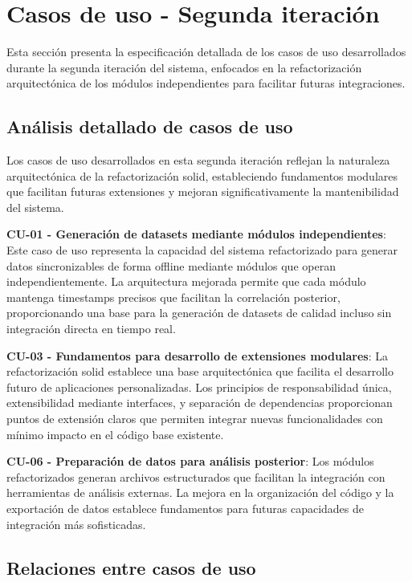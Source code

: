 \section{Casos de uso - Segunda iteración}
\label{sec:casos_uso_it2}

Esta sección presenta la especificación detallada de los casos de uso desarrollados durante la segunda iteración del sistema, enfocados en la refactorización arquitectónica de los módulos independientes para facilitar futuras integraciones.

\subsection{Análisis detallado de casos de uso}
\label{subsec:analisis_detallado_casos_uso_it2}

Los casos de uso desarrollados en esta segunda iteración reflejan la naturaleza arquitectónica de la refactorización \acrshort{solid}, estableciendo fundamentos modulares que facilitan futuras extensiones y mejoran significativamente la mantenibilidad del sistema.

\textbf{CU-01 - Generación de datasets mediante módulos independientes}: Este caso de uso representa la capacidad del sistema refactorizado para generar datos sincronizables de forma offline mediante módulos que operan independientemente. La arquitectura mejorada permite que cada módulo mantenga timestamps precisos que facilitan la correlación posterior, proporcionando una base para la generación de datasets de calidad incluso sin integración directa en tiempo real.

\textbf{CU-03 - Fundamentos para desarrollo de extensiones modulares}: La refactorización \acrshort{solid} establece una base arquitectónica que facilita el desarrollo futuro de aplicaciones personalizadas. Los principios de responsabilidad única, extensibilidad mediante interfaces, y separación de dependencias proporcionan puntos de extensión claros que permiten integrar nuevas funcionalidades con mínimo impacto en el código base existente.

\textbf{CU-06 - Preparación de datos para análisis posterior}: Los módulos refactorizados generan archivos estructurados que facilitan la integración con herramientas de análisis externas. La mejora en la organización del código y la exportación de datos establece fundamentos para futuras capacidades de integración más sofisticadas.

\subsection{Relaciones entre casos de uso}
\label{subsec:relaciones_casos_uso_it2}

